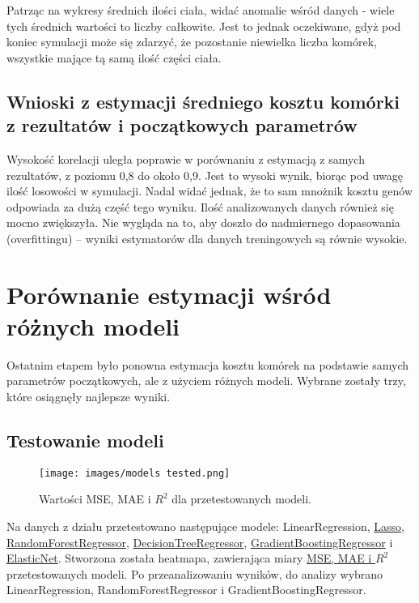 \documentclass{article}
\begin{document}
Patrząc na wykresy średnich ilości ciała, widać anomalie wśród danych - wiele tych średnich wartości to liczby całkowite. Jest to jednak oczekiwane, gdyż pod koniec symulacji może się zdarzyć, że pozostanie niewielka liczba komórek, wszystkie mające tą samą ilość części ciała.

\subsection{Wnioski z estymacji średniego kosztu komórki z rezultatów i początkowych parametrów}

Wysokość korelacji uległa poprawie w porównaniu z estymacją z samych rezultatów, z poziomu 0,8 do około 0,9. Jest to wysoki wynik, biorąc pod uwagę ilość losowości w symulacji. Nadal widać jednak, że to sam mnożnik kosztu genów odpowiada za dużą część tego wyniku. Ilość analizowanych danych również się mocno zwiększyła. Nie wygląda na to, aby doszło do nadmiernego dopasowania (overfittingu) -- wyniki estymatorów dla danych treningowych są równie wysokie. 

\section{Porównanie estymacji wśród różnych modeli}
Ostatnim etapem było ponowna estymacja kosztu komórek na podstawie samych parametrów początkowych, ale z użyciem różnych modeli. Wybrane zostały trzy, które osiągnęły najlepsze wyniki.

\subsection{Testowanie modeli}

\begin{figure}[H]
    \centering
    \texttt{[image: images/models tested.png]}
    \caption{Wartości MSE, MAE i \(R^2\) dla przetestowanych modeli.}
\end{figure}

Na danych z działu  przetestowano następujące modele:
LinearRegression, \href{https://scikit-learn.org/stable/modules/generated/sklearn.linear_model.Lasso.html}{Lasso}, 
\href{https://scikit-learn.org/stable/modules/generated/sklearn.ensemble.RandomForestRegressor.html}{RandomForestRegressor}, \href{https://scikit-learn.org/stable/modules/generated/sklearn.tree.DecisionTreeRegressor.html}{DecisionTreeRegressor}, \href{https://scikit-learn.org/stable/modules/generated/sklearn.ensemble.GradientBoostingRegressor.html}{GradientBoostingRegressor} i \href{https://scikit-learn.org/stable/modules/generated/sklearn.linear_model.ElasticNet.html}{ElasticNet}. 
Stworzona została heatmapa, zawierająca miary \href{https://help.qlik.com/pl-PL/cloud-services/Subsystems/Hub/Content/Sense_Hub/AutoML/scoring-regression.htm}{MSE, MAE i \(R^2\)} przetestowanych modeli. 
Po przeanalizowaniu wyników, do analizy wybrano LinearRegression, RandomForestRegressor i GradientBoostingRegressor.
\end{document}
